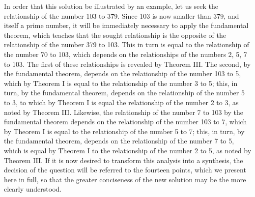 \documentclass[twoside,12pt, showframe]{memoir}
\begin{document}
In order that this solution be illustrated by an example, let us seek the relationship of the number 103 to 379. Since 103 is now smaller than 379, and itself a prime number, it will be immediately necessary to apply the fundamental theorem, which teaches that the sought relationship is the opposite of the relationship of the number 379 to 103. This in turn is equal to the relationship of the number 70 to 103, which depends on the relationships of the numbers 2, 5, 7 to 103. The first of these relationships is revealed by Theorem III. The second, by the fundamental theorem, depends on the relationship of the number 103 to 5, which by Theorem I is equal to the relationship of the number 3 to 5; this, in turn, by the fundamental theorem, depends on the relationship of the number 5 to 3, to which by Theorem I is equal the relationship of the number 2 to 3, as noted by Theorem III. Likewise, the relationship of the number 7 to 103 by the fundamental theorem depends on the relationship of the number 103 to 7, which by Theorem I is equal to the relationship of the number 5 to 7; this, in turn, by the fundamental theorem, depends on the relationship of the number 7 to 5, which is equal by Theorem I to the relationship of the number 2 to 5, as noted by Theorem III. If it is now desired to transform this analysis into a synthesis, the decision of the question will be referred to the fourteen points, which we present here in full, so that the greater conciseness of the new solution may be the more clearly understood.
%
\end{document}
